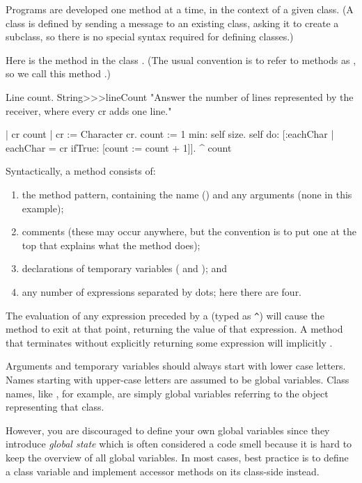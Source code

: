 \documentclass[a4paper,10pt,twoside]{book}
\begin{document}
Programs are developed one method at a time, in the context of a given class.
(A class is defined by sending a message to an existing class, asking it to create a subclass, so there is no special syntax required for defining classes.)

Here is the method  in the class .
(The usual convention is to refer to methods as , so we call this method .)

\begin{method}[lineCount]{Line count.}
String>>>lineCount
   "Answer the number of lines represented by the receiver,
   where every cr adds one line."

   | cr count |
   cr := Character cr.
   count := 1 min: self size.
   self do: [:eachChar |
      eachChar = cr ifTrue: [count := count + 1]].
   ^ count
\end{method}

Syntactically, a method consists of:
\begin{enumerate}
  \item the method pattern, containing the name (\ie {}) and any arguments (none in this example);
  \item comments (these may occur anywhere, but the convention is to put one at the top that explains what the method does);
  \item declarations of temporary variables (\ie {} and ); and
  \item any number of expressions separated by dots; here there are four.
\end{enumerate}

The evaluation of any expression preceded by a \ct{^} (typed as \verb|^|) will cause the method to exit at that point, returning the value of that expression.
A method that terminates without explicitly returning some expression will implicitly  .

Arguments and temporary variables should always start with lower case letters.
Names starting with upper-case letters are assumed to be global variables.
Class names, like , for example, are simply global variables referring to the object representing that class.

However, you are discouraged to define your own global variables since they introduce \emph{global state} which is often considered a code smell because it is hard to keep the overview of all global variables.
In most cases, best practice is to define a class variable and implement accessor methods on its class-side instead.
\end{document}
